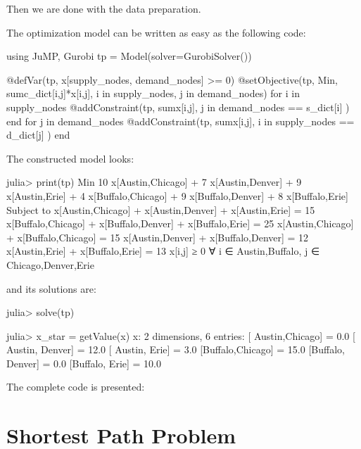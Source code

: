 Then we are done with the data preparation.

The optimization model can be written as easy as the following code:
\begin{code}
using JuMP, Gurobi
tp = Model(solver=GurobiSolver())

@defVar(tp, x[supply_nodes, demand_nodes] >= 0)
@setObjective(tp, Min, sum{c_dict[i,j]*x[i,j],
                              i in supply_nodes, j in demand_nodes})
for i in supply_nodes
    @addConstraint(tp, sum{x[i,j], j in demand_nodes} == s_dict[i] )
end
for j in demand_nodes
    @addConstraint(tp, sum{x[i,j], i in supply_nodes} == d_dict[j] )
end
\end{code}
\noindent The constructed model looks:
\begin{code}
julia> print(tp)
Min 10 x[Austin,Chicago] + 7 x[Austin,Denver] + 9 x[Austin,Erie]
+ 4 x[Buffalo,Chicago] + 9 x[Buffalo,Denver] + 8 x[Buffalo,Erie]
Subject to
 x[Austin,Chicago] + x[Austin,Denver] + x[Austin,Erie] = 15
 x[Buffalo,Chicago] + x[Buffalo,Denver] + x[Buffalo,Erie] = 25
 x[Austin,Chicago] + x[Buffalo,Chicago] = 15
 x[Austin,Denver] + x[Buffalo,Denver] = 12
 x[Austin,Erie] + x[Buffalo,Erie] = 13
 x[i,j] ≥ 0 ∀ i ∈ {Austin,Buffalo}, j ∈ {Chicago,Denver,Erie}
\end{code}
\noindent and its solutions are:
\begin{code}
julia> solve(tp)

julia> x_star = getValue(x)
x: 2 dimensions, 6 entries:
 [ Austin,Chicago] = 0.0
 [ Austin, Denver] = 12.0
 [ Austin,   Erie] = 3.0
 [Buffalo,Chicago] = 15.0
 [Buffalo, Denver] = 0.0
 [Buffalo,   Erie] = 10.0
\end{code}


The complete code is presented:
\begin{codelisting}
\end{codelisting}





















\section{Shortest Path Problem}

